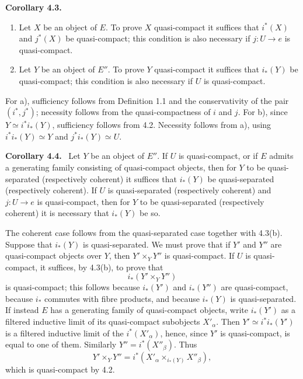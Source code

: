 \documentclass[11pt]{article}
\newenvironment{statement}[1]{\par\medskip\noindent\textbf{#1.}\ }{\par\medskip}
\begin{document}
\begin{statement}{Corollary 4.3}
\begin{enumerate}[label=\alph*)]
\item Let \(X\) be an object of \(E\). To prove \(X\) quasi-compact it suffices that \(i^*(X)\) and \(j^*(X)\) be quasi-compact; this condition is also necessary if \(j:U\to e\) is quasi-compact.
\item Let \(Y\) be an object of \(E''\). To prove \(Y\) quasi-compact it suffices that \(i_*(Y)\) be quasi-compact; this condition is also necessary if \(U\) is quasi-compact.
\end{enumerate}
\end{statement}

For a), sufficiency follows from Definition 1.1 and the conservativity of the pair \((i^*,j^*)\); necessity follows from the quasi-compactness of \(i\) and \(j\). For b), since \(Y\simeq i^*i_*(Y)\), sufficiency follows from 4.2. Necessity follows from a), using \(i^*i_*(Y)\simeq Y\) and \(j^*i_*(Y)\simeq U\).

\begin{statement}{Corollary 4.4}
Let \(Y\) be an object of \(E''\). If \(U\) is quasi-compact, or if \(E\) admits a generating family consisting of quasi-compact objects, then for \(Y\) to be quasi-separated (respectively coherent) it suffices that \(i_*(Y)\) be quasi-separated (respectively coherent). If \(U\) is quasi-separated (respectively coherent) and \(j:U\to e\) is quasi-compact, then for \(Y\) to be quasi-separated (respectively coherent) it is necessary that \(i_*(Y)\) be so.
\end{statement}

The coherent case follows from the quasi-separated case together with 4.3(b). Suppose that \(i_*(Y)\) is quasi-separated. We must prove that if \(Y'\) and \(Y''\) are quasi-compact objects over \(Y\), then \(Y'\times_Y Y''\) is quasi-compact. If \(U\) is quasi-compact, it suffices, by 4.3(b), to prove that
\[
 i_*(Y'\times_Y Y'')
\]
is quasi-compact; this follows because \(i_*(Y')\) and \(i_*(Y'')\) are quasi-compact, because \(i_*\) commutes with fibre products, and because \(i_*(Y)\) is quasi-separated. If instead \(E\) has a generating family of quasi-compact objects, write \(i_*(Y')\) as a filtered inductive limit of its quasi-compact subobjects \(X'_\alpha\). Then \(Y'\simeq i^*i_*(Y')\) is a filtered inductive limit of the \(i^*(X'_\alpha)\), hence, since \(Y'\) is quasi-compact, is equal to one of them. Similarly \(Y''=i^*(X''_\beta)\). Thus
\[
Y'\times_Y Y''=i^*(X'_\alpha\times_{i_*(Y)}X''_\beta),
\]
which is quasi-compact by 4.2.
\end{document}
